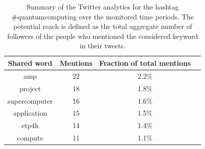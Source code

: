 \begin{table}[t]
 \begin{center}
 {\scriptsize
  \begin{tabular}{cccc}
   \hline 
   \hline
   Shared word & Mentions & Fraction of total mentions \\ 
   \hline
   \hline
   amp & 22 & 2.2\% \\
   project & 18 & 1.8\% \\
   supercomputer & 16 & 1.6\% \\
   application & 15 & 1.5\% \\
   etp4h & 14 & 1.4\% \\
   compute & 11 & 1.1\% \\
   \hline
   \hline
  \end{tabular}
 } 
 \end{center} 
 \caption{Summary of the Twitter analytics for the hashtag \#quantumcomputing over the monitored time periods. The potential reach is defined as the total aggregate number of followers of the people who mentioned the considered keyword in their tweets.}
\label{Most_shared_words} 
\end{table}